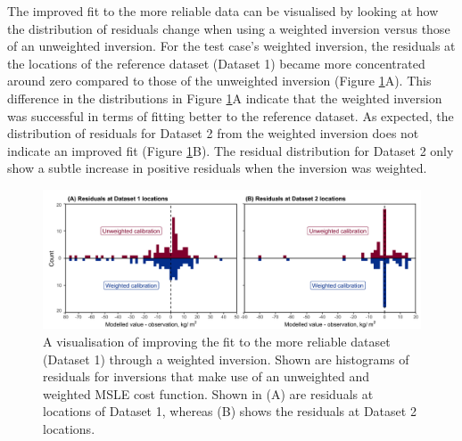 \documentclass[a4paper,fleqn]{cas-sc}
\begin{document}
The improved fit to the more reliable data can be visualised by looking at how the distribution of residuals change when using a weighted inversion versus those of an unweighted inversion. For the test case's weighted inversion, the residuals at the locations of the reference dataset (Dataset 1) became more concentrated around zero compared to those of the unweighted inversion (Figure \ref{fig:histvaruncert}A). This difference in the distributions in Figure \ref{fig:histvaruncert}A indicate that the weighted inversion was successful in terms of fitting better to the reference dataset. As expected, the distribution of residuals for Dataset 2 from the weighted inversion does not indicate an improved fit (Figure \ref{fig:histvaruncert}B). The residual distribution for Dataset 2 only show a subtle increase in positive residuals when the inversion was weighted.

    \begin{figure}[htbp!]
    \centering
    \includegraphics[width=\linewidth]{Figures/fig6_histograms-weighting.png}
    \caption{A visualisation of improving the fit to the more reliable dataset (Dataset 1) through a weighted inversion. Shown are histograms of residuals for inversions that make use of an unweighted and weighted MSLE cost function. Shown in (A) are residuals at locations of Dataset 1, whereas (B) shows the residuals at Dataset 2 locations.}
    \label{fig:histvaruncert}
    \end{figure}
\end{document}
